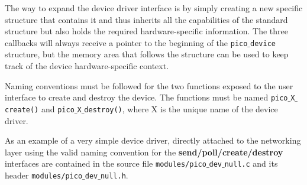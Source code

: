 The way to expand the device driver interface is by simply creating a new specific structure
that contains it and thus inherits all the capabilities of the standard structure but also holds
the required hardware-specific information. The three callbacks will always receive a pointer
to the beginning of the \texttt{pico$\_$device} structure, but the memory area that follows
the structure can be used to keep track of the device hardware-specific context.

Naming conventions must be followed for the two functions exposed to the user interface to
create and destroy the device. The functions must be named \texttt{pico$\_$X$\_$create()} and
\texttt{pico$\_$X$\_$destroy()}, where X is the unique name of the device driver.

As an example of a very simple device driver, directly attached to the networking layer using
the valid naming convention for the \textbf{send/poll/create/destroy} interfaces are contained in the source
file \texttt{modules/pico$\_$dev$\_$null.c} and its header \texttt{modules/pico$\_$dev$\_$null.h}.